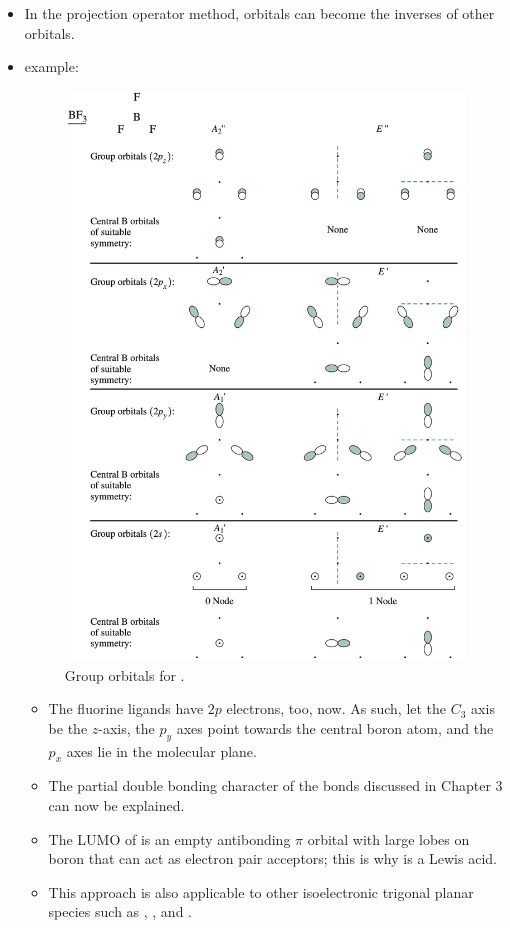 \documentclass[../notes.tex]{subfiles}
\begin{document}
\begin{itemize}
\begin{itemize}
    \end{itemize}
    \item In the projection operator method, orbitals can become the inverses of other orbitals.
    \item {} example:
    \begin{figure}[h!]
        \centering
        \includegraphics[width=0.7\linewidth]{../ExtFiles/groupOrbitals-BF3.png}
        \caption{Group orbitals for .}
        \label{fig:groupOrbitals-BF3}
    \end{figure}
    \begin{itemize}
        \item The fluorine ligands have $2p$ electrons, too, now. As such, let the $C_3$ axis be the $z$-axis, the $p_y$ axes point towards the central boron atom, and the $p_x$ axes lie in the molecular plane.
        \item The partial double bonding character of the  bonds discussed in Chapter 3 can now be explained.
        \item The LUMO of  is an empty antibonding $\pi$ orbital with large lobes on boron that can act as electron pair acceptors; this is why  is a Lewis acid.
        \item This approach is also applicable to other isoelectronic trigonal planar species such as , , and .

\end{itemize}
\end{itemize}
\end{document}
